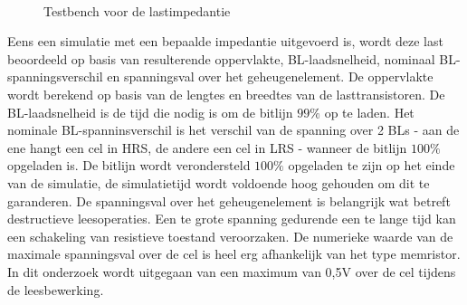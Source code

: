 \begin{figure}[!ht]
\centering
{}
\\
\caption[Testbench voor de lastimpedantie]{Testbench voor de lastimpedantie}\label{fig:simsetup}
\end{figure}

Eens een simulatie met een bepaalde impedantie uitgevoerd is, wordt deze last beoordeeld op basis van resulterende oppervlakte, BL-laadsnelheid, nominaal BL-spanningsverschil en spanningsval over het geheugenelement. De oppervlakte wordt berekend op basis van de lengtes en breedtes van de lasttransistoren. De BL-laadsnelheid is de tijd die nodig is om de bitlijn $99\%$ op te laden. Het nominale BL-spanninsverschil is het verschil van de spanning over 2 BLs - aan de ene hangt een cel in HRS, de andere een cel in LRS - wanneer de bitlijn $100\%$ opgeladen is. De bitlijn wordt verondersteld $100\%$ opgeladen te zijn op het einde van de simulatie, de simulatietijd wordt voldoende hoog gehouden om dit te garanderen. De spanningsval over het geheugenelement is belangrijk wat betreft destructieve leesoperaties. Een te grote spanning gedurende een te lange tijd kan een schakeling van resistieve toestand veroorzaken. De numerieke waarde van de maximale spanningsval over de cel is heel erg afhankelijk van het type memristor. In dit onderzoek wordt uitgegaan van een maximum van 0,5V over de cel tijdens de leesbewerking\cite{ppt:model}.

